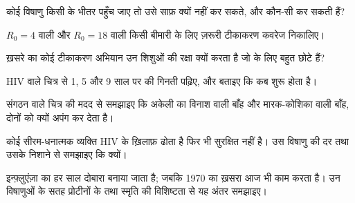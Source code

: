 \begin{exercise}[$\star\star$]\label{exo:g12:adaptive-immunity:8}
कोई विषाणु किसी  के भीतर पहुँच जाए तो  उसे साफ़ क्यों नहीं
कर सकते, और कौन-सी  कर सकती हैं?
\end{exercise}

\begin{exercise}[$\star\star$]\label{exo:g12:adaptive-immunity:9}
$R_0 = 4$ वाली और $R_0 = 18$ वाली किसी बीमारी के लिए ज़रूरी टीकाकरण कवरेज
निकालिए।
\end{exercise}

\begin{exercise}[$\star\star$]\label{exo:g12:adaptive-immunity:10}
ख़सरे का कोई टीकाकरण अभियान उन शिशुओं की रक्षा क्यों करता है जो  के लिए
बहुत छोटे हैं?
\end{exercise}

\begin{exercise}[$\star\star$]\label{exo:g12:adaptive-immunity:11}
HIV वाले चित्र से 1, 5 और 9 साल पर  की गिनती पढ़िए, और
बताइए कि  कब शुरू होता है।
\end{exercise}

\begin{exercise}[$\star\star\star$]\label{exo:g12:adaptive-immunity:12}
संगठन वाले चित्र की मदद से समझाइए कि अकेली  का विनाश
 वाली बाँह और मारक-कोशिका वाली बाँह, दोनों को क्यों अपंग कर देता है।
\end{exercise}

\begin{exercise}[$\star\star\star$]\label{exo:g12:adaptive-immunity:13}
कोई सीरम-धनात्मक व्यक्ति HIV के ख़िलाफ़  ढोता है फिर भी सुरक्षित
नहीं है। उस विषाणु की  दर तथा उसके निशाने से समझाइए कि क्यों।
\end{exercise}

\begin{exercise}[$\star\star\star$]\label{exo:g12:adaptive-immunity:14}
इन्फ़्लुएंज़ा का  हर साल दोबारा बनाया जाता है; जबकि 1970 का ख़सरा 
आज भी काम करता है। उन विषाणुओं के सतह प्रोटीनों के  तथा स्मृति की
विशिष्टता से यह अंतर समझाइए।
\end{exercise}

